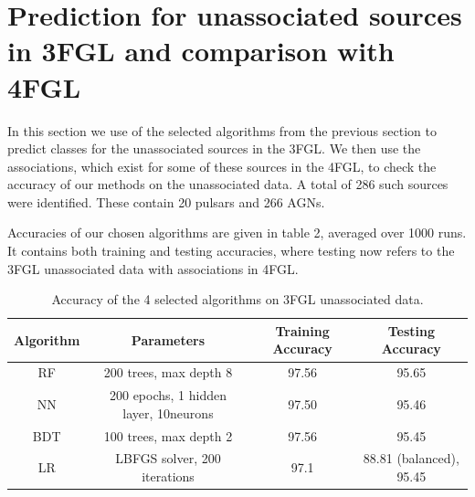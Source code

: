 \section{Prediction for unassociated sources in 3FGL and comparison with 4FGL}


In this section we use of the selected algorithms from the previous section to predict classes for the unassociated sources in the 3FGL. 
We then use the associations, which exist for some of these sources in the 4FGL, to check the accuracy of our methods on the unassociated data.  A total of 286 such sources were identified. These contain 20 pulsars and 266 AGNs.


Accuracies of our chosen algorithms are given in table 2, averaged over 1000 runs. It contains both training and testing accuracies, where testing now refers to the 3FGL unassociated data with associations in 4FGL. 


\begin{table}[!h]
    \tiny
    \renewcommand{\tabcolsep}{0.3mm}
\renewcommand{\arraystretch}{1.5}

    \begin{tabular}{|c|c|c|c|}
    \hline
    Algorithm&Parameters & Training Accuracy & Testing Accuracy\\
    \hline
    RF& 200 trees, max depth 8  &97.56& 95.65   \\
    \hline
    NN & 200 epochs, 1 hidden layer, 10neurons & 97.50& 95.46 \\
    \hline %
    BDT & 100 trees, max depth 2    &   97.56&95.45  \\
    \hline
    LR & LBFGS solver, 200 iterations & 97.1&88.81 (balanced), 95.45 \\
    \hline
     
    \end{tabular}

    \caption{Accuracy of the 4 selected algorithms on 3FGL unassociated data.}
    \label{tab:selected_algs}
\end{table}

